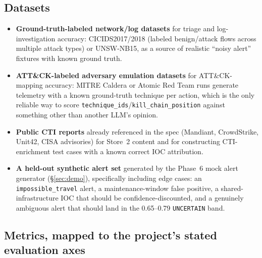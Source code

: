 \documentclass[11pt]{article}
\begin{document}
\subsection{Datasets}
\begin{itemize}
  \item \textbf{Ground-truth-labeled network/log datasets} for triage and log-investigation accuracy: CICIDS2017/2018 (labeled benign/attack flows across multiple attack types) or UNSW-NB15, as a source of realistic ``noisy alert'' fixtures with known ground truth.
  \item \textbf{ATT\&CK-labeled adversary emulation datasets} for ATT\&CK-mapping accuracy: MITRE Caldera or Atomic Red Team runs generate telemetry with a known ground-truth technique per action, which is the only reliable way to score \texttt{technique\_ids}/\texttt{kill\_chain\_position} against something other than another LLM's opinion.
  \item \textbf{Public CTI reports} already referenced in the spec (Mandiant, CrowdStrike, Unit42, CISA advisories) for Store~2 content and for constructing CTI-enrichment test cases with a known correct IOC attribution.
  \item \textbf{A held-out synthetic alert set} generated by the Phase~6 mock alert generator (\S\ref{sec:demo}), specifically including edge cases: an \texttt{impossible\_travel} alert, a maintenance-window false positive, a shared-infrastructure IOC that should be confidence-discounted, and a genuinely ambiguous alert that should land in the 0.65--0.79 \texttt{UNCERTAIN} band.
\end{itemize}

\subsection{Metrics, mapped to the project's stated evaluation axes}
\end{document}
